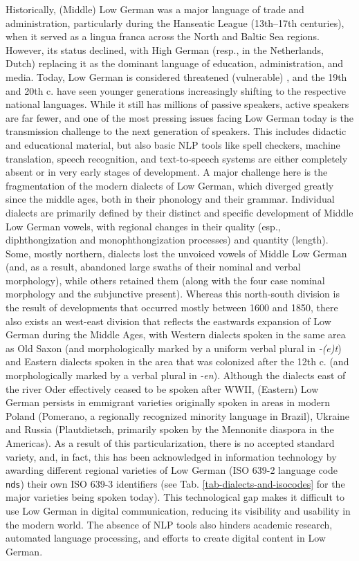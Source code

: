 \documentclass[11pt]{article}
\newcommand{\word}[1]{\textsl{#1}} %
\newcommand{\code}[1]{\texttt{#1}} %
\begin{document}
Historically, (Middle) Low German was a major language of trade and administration, particularly during the Hanseatic League (13th–17th centuries), when it served as a lingua franca across the North and Baltic Sea regions. However, its status declined, with High German (resp., in the Netherlands, Dutch) replacing it as the dominant language of education, administration, and media. Today, Low German is considered threatened (vulnerable) \cite[p.25]{moseley2010atlas}, and the 19th and 20th c. have seen younger generations increasingly shifting to the respective national languages. While it still has millions of passive speakers, active speakers are far fewer, and one of the most pressing issues facing Low German today is the transmission challenge to the next generation of speakers. This includes didactic and educational material, but also basic NLP tools like spell checkers, machine translation, speech recognition, and text-to-speech systems are either completely absent or in very early stages of development. A major challenge here is the fragmentation of the modern dialects of Low German, which diverged greatly since the middle ages, both in their phonology and their grammar. Individual dialects are primarily defined by their distinct and specific development of Middle Low German vowels, with regional changes in their quality (esp., diphthongization and monophthongization processes) and quantity (length). Some, mostly northern, dialects lost the unvoiced vowels of Middle Low German (and, as a result, abandoned large swaths of their nominal and verbal morphology), while others retained them (along with the four case nominal morphology and the subjunctive present). Whereas this north-south division is the result of developments that occurred mostly between 1600 and 1850, there also exists an west-east division that reflects the eastwards expansion of Low German during the Middle Ages, with Western dialects spoken in the same area as Old Saxon (and morphologically marked by a uniform verbal plural in \word{-(e)t}) and Eastern dialects spoken in the area that was colonized after the 12th c. (and morphologically marked by a verbal plural in \word{-en}). Although the dialects east of the river Oder effectively ceased to be spoken after WWII, (Eastern) Low German persists in emmigrant varieties originally spoken in areas in modern Poland (Pomerano, a regionally recognized minority language in Brazil), Ukraine and Russia (Plautdietsch, primarily spoken by the Mennonite diaspora in the Americas). 
As a result of this particularization, there is no accepted standard variety, and, in fact, this has been acknowledged in information technology by awarding different regional varieties of Low German (ISO 639-2 language code \code{nds}) their own ISO 639-3 identifiers (see Tab. \ref{tab-dialects-and-isocodes} for the major varieties being spoken today). This technological gap makes it difficult to use Low German in digital communication, reducing its visibility and usability in the modern world. The absence of NLP tools also hinders academic research, automated language processing, and efforts to create digital content in Low German. 
\end{document}
